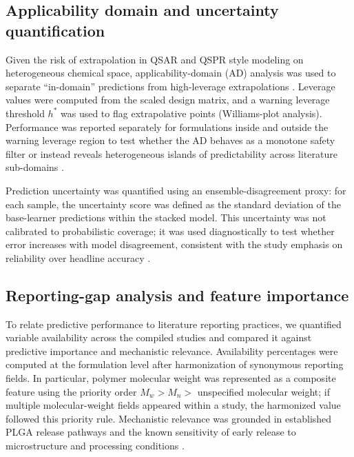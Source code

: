 \documentclass[preprint,12pt,authoryear]{elsarticle}
\begin{document}
\subsection{Applicability domain and uncertainty quantification}
\label{sec:ad_uq}
Given the risk of extrapolation in QSAR and QSPR style modeling on heterogeneous chemical space, applicability-domain (AD) analysis was used to separate ``in-domain'' predictions from high-leverage extrapolations \citep{OECD2004QSAR,OECD2007QSARGuidance,WeaverGleeson2008,Netzeva2005AD,Tropsha2010BestPracticesQSAR,Gramatica2007QSARValidation}. Leverage values were computed from the scaled design matrix, and a warning leverage threshold $h^*$ was used to flag extrapolative points (Williams-plot analysis). Performance was reported separately for formulations inside and outside the warning leverage region to test whether the AD behaves as a monotone safety filter or instead reveals heterogeneous islands of predictability across literature sub-domains \citep{WeaverGleeson2008,Netzeva2005AD}.

Prediction uncertainty was quantified using an ensemble-disagreement proxy: for each sample, the uncertainty score was defined as the standard deviation of the base-learner predictions within the stacked model. This uncertainty was not calibrated to probabilistic coverage; it was used diagnostically to test whether error increases with model disagreement, consistent with the study emphasis on reliability over headline accuracy \citep{WeaverGleeson2008}.

\subsection{Reporting-gap analysis and feature importance}
To relate predictive performance to literature reporting practices, we quantified variable availability across the compiled studies and compared it against predictive importance and mechanistic relevance. Availability percentages were computed at the formulation level after harmonization of synonymous reporting fields. In particular, polymer molecular weight was represented as a composite feature using the priority order $M_w > M_n >$ unspecified molecular weight; if multiple molecular-weight fields appeared within a study, the harmonized value followed this priority rule. Mechanistic relevance was grounded in established PLGA release pathways and the known sensitivity of early release to microstructure and processing conditions \citep{Fredenberg2011,FreibergZhu2004,Jain2000,Yoo2020Burst,KloseSiepmann2006Porosity}.
\end{document}
